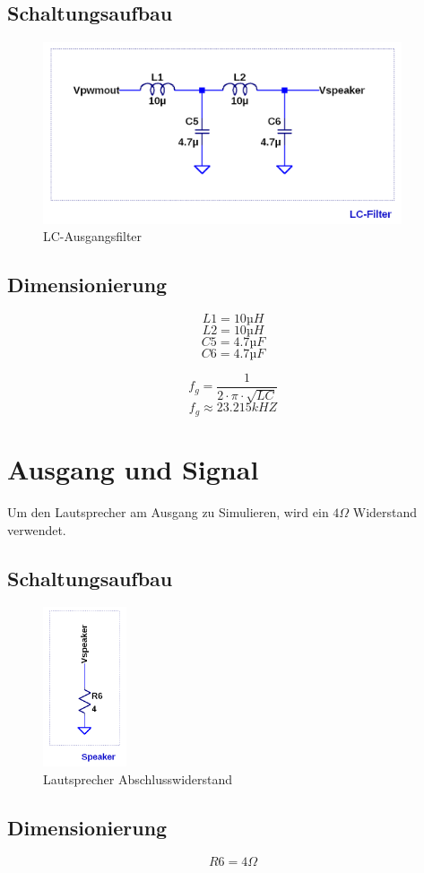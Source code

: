 \documentclass[11pt,a4paper,bibtotoc,oneside]{scrbook}
\begin{document}
\subsection{Schaltungsaufbau}
\begin{figure}[ht]
    \centering
        \includegraphics[width=300pt]{./picture/lc_filter.png}
        \caption{\label{lc}{LC-Ausgangsfilter}}
    \end{figure}
\subsection{Dimensionierung}
\[L1 = 10µH\]
\[L2 = 10µH\]
\[C5 = 4.7µF\]
\[C6 = 4.7µF\]

\[ f_g = \frac{1}{2\cdot\pi\cdot\sqrt{LC}}\]
\[ f_g \approx 23.215 kHZ \]


\section{Ausgang und Signal}
Um den Lautsprecher am Ausgang zu Simulieren, wird ein $4 \Omega$ Widerstand verwendet. 
\subsection{Schaltungsaufbau}
\begin{figure}[ht]
    \centering
        \includegraphics[width=70pt]{./picture/speaker.png}
        \caption{\label{lc}{Lautsprecher Abschlusswiderstand}}
    \end{figure}
\subsection{Dimensionierung}
\[R6 = 4\Omega\]
\end{document}
